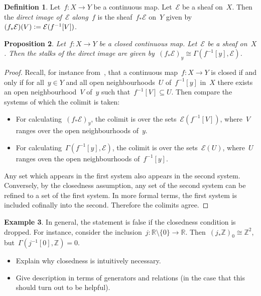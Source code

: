 \documentclass[10pt]{amsart}
\theoremstyle{definition}
\newtheorem{defn}{Definition}[section]
\newtheorem{ex}[defn]{Example}
\theoremstyle{plain}
\newtheorem{prop}[defn]{Proposition}
\theoremstyle{remark}
\newcommand{\E}{\mathcal{E}}
\newcommand{\ZZ}{\mathbb{Z}}
\newcommand{\RR}{\mathbb{R}}
\newcommand{\defeq}{\vcentcolon=}
\begin{document}
\begin{defn}Let~$f : X \to Y$ be a continuous map. Let~$\E$ be a sheaf on~$X$.
Then the \emph{direct image of~$\E$ along~$f$} is the sheaf~$f_*\E$ on~$Y$
given by~$(f_*\E)(V) \defeq \E(f^{-1}[V])$.\end{defn}

\begin{prop}Let~$f : X \to Y$ be a closed continuous map. Let~$\E$ be a sheaf
on~$X$. Then the stalks of the direct image are given by~$(f_*\E)_y \cong
\Gamma(f^{-1}[y], \E)$.\end{prop}

\begin{proof}Recall, for instance from~\cite[Lemma~8.10]{wedhorn},
that a continuous map~$f : X \to Y$ is closed if and only if for all~$y \in Y$
and all open neighbourhoods~$U$ of~$f^{-1}[y]$ in~$X$ there exists an open
neighbourhood~$V$ of~$y$ such that~$f^{-1}[V] \subseteq U$. Then compare the
systems of which the colimit is taken:
\begin{itemize}
\item For calculating~$(f_*\E)_y$, the colimit is over the
sets~$\E(f^{-1}[V])$, where~$V$ ranges over the open neighbourhoods of~$y$.
\item For calculating~$\Gamma(f^{-1}[y],\E)$, the colimit is over the
sets~$\E(U)$, where~$U$ ranges oven the open neighbourhoods of~$f^{-1}[y]$.
\end{itemize}
Any set which appears in the first system also appears in the second system.
Conversely, by the closedness assumption, any set of the second system can be
refined to a set of the first system. In more formal terms, the first system is
included cofinally into the second. Therefore the colimits agree.
\end{proof}

\begin{ex}In general, the statement is false if the closedness condition is
dropped. For instance, consider the inclusion~$j : \RR \setminus \{0\} \to \RR$.
Then~$(j_* \ZZ)_0 \cong \ZZ^2$, but~$\Gamma(j^{-1}[0],\ZZ) = 0$.\end{ex}

\begin{itemize}
\item Explain why closedness is intuitively necessary.
\item Give description in terms of generators and relations (in the case that
this should turn out to be helpful).
\end{itemize}
\end{document}

